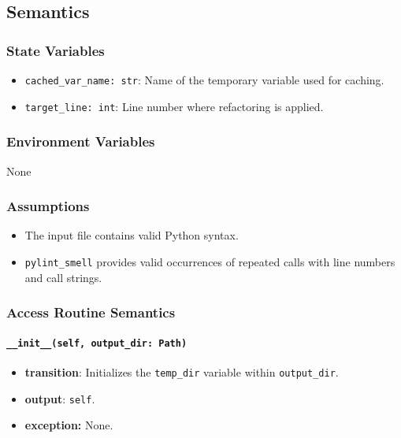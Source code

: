 \documentclass[12pt, titlepage]{article}
\begin{document}
\subsection{Semantics}

\subsubsection{State Variables}
\begin{itemize}
  \item \texttt{cached\_var\_name: str}: Name of the temporary variable used for caching.
  \item \texttt{target\_line: int}: Line number where refactoring is applied.
\end{itemize}

\subsubsection{Environment Variables}
None

\subsubsection{Assumptions}
\begin{itemize}
  \item The input file contains valid Python syntax.
  \item \texttt{pylint\_smell} provides valid occurrences of repeated calls with line numbers and call strings.
\end{itemize}

\subsubsection{Access Routine Semantics}

\paragraph{\texttt{\_\_init\_\_(self, output\_dir: Path)}}
\begin{itemize}
  \item \textbf{transition}: Initializes the \texttt{temp\_dir} variable within \texttt{output\_dir}.
  \item \textbf{output}: \texttt{self}.
  \item \textbf{exception:} None.
\end{itemize}
\end{document}
